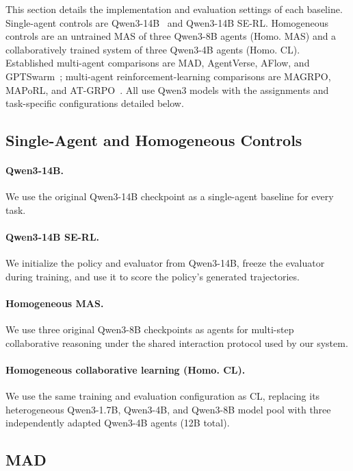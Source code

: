 This section details the implementation and evaluation settings of each baseline. Single-agent controls are Qwen3-14B~\citep{yang2025qwen3} and Qwen3-14B SE-RL. Homogeneous controls are an untrained MAS of three Qwen3-8B agents (Homo. MAS) and a collaboratively trained system of three Qwen3-4B agents (Homo. CL). Established multi-agent comparisons are MAD, AgentVerse, AFlow, and GPTSwarm~\citep{du2024debate,chen2024agentverse,zhang2025aflow,zhuge2024gptswarm}; multi-agent reinforcement-learning comparisons are MAGRPO, MAPoRL, and AT-GRPO~\citep{liu2026collaboration,park2025maporl,zhao2026strongermas}. All use Qwen3 models with the assignments and task-specific configurations detailed below.

\subsection{Single-Agent and Homogeneous Controls}

\paragraph{Qwen3-14B.}
We use the original Qwen3-14B checkpoint as a single-agent baseline for every task.

\paragraph{Qwen3-14B SE-RL.}
We initialize the policy and evaluator from Qwen3-14B, freeze the evaluator during training, and use it to score the policy's generated trajectories.

\paragraph{Homogeneous MAS.}
We use three original Qwen3-8B checkpoints as agents for multi-step collaborative reasoning under the shared interaction protocol used by our system.

\paragraph{Homogeneous collaborative learning (Homo. CL).}
We use the same training and evaluation configuration as CL, replacing its heterogeneous Qwen3-1.7B, Qwen3-4B, and Qwen3-8B model pool with three independently adapted Qwen3-4B agents (12B total).

\subsection{MAD}

